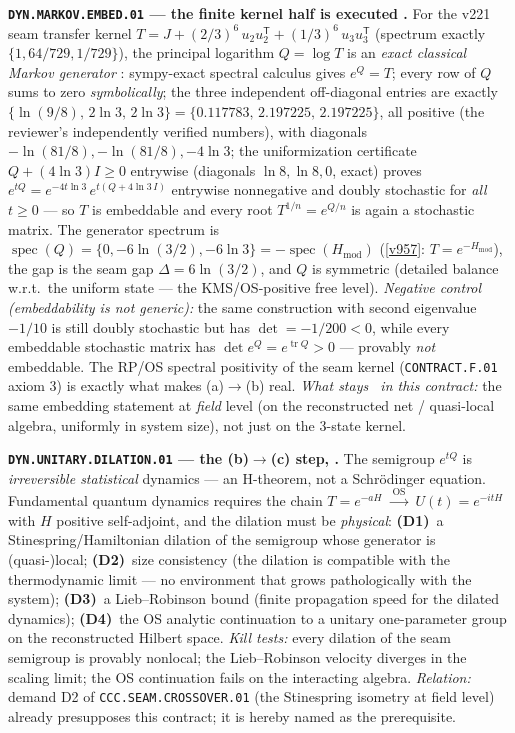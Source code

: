 \documentclass[11pt,a4paper]{article}
\begin{document}
\par\smallskip\noindent\textbf{\texttt{DYN.MARKOV.EMBED.01} --- the finite kernel half is
executed \mE.}  For the v221 seam transfer
kernel $T=J+(2/3)^6\,u_2u_2^{\mathsf T}+(1/3)^6\,u_3u_3^{\mathsf T}$ (spectrum exactly
$\{1,64/729,1/729\}$), the principal logarithm $Q=\log T$ is an \emph{exact classical Markov
generator} : sympy-exact spectral calculus gives
$e^Q=T$; every row of $Q$ sums to zero
\emph{symbolically}; the three independent off-diagonal entries are exactly
$\{\ln(9/8),\,2\ln 3,\,2\ln 3\}=\{0.117783,\,2.197225,\,2.197225\}$, all positive (the reviewer's
independently verified numbers), with diagonals $-\ln(81/8),-\ln(81/8),-4\ln3$; the
uniformization certificate $Q+(4\ln3)I\ge0$ entrywise (diagonals $\ln8,\ln8,0$, exact) proves
$e^{tQ}=e^{-4t\ln3}\,e^{t(Q+4\ln3\,I)}$ entrywise nonnegative and doubly stochastic for
\emph{all} $t\ge0$ --- so $T$ is embeddable and every root $T^{1/n}=e^{Q/n}$ is again a
stochastic matrix.  The generator spectrum is
$\operatorname{spec}(Q)=\{0,-6\ln(3/2),-6\ln3\}=-\operatorname{spec}(H_{\mathrm{mod}})$
(\vref{v957}: $T=e^{-H_{\mathrm{mod}}}$), the gap is the seam gap $\Delta=6\ln(3/2)$, and $Q$ is
symmetric (detailed balance w.r.t.\ the uniform state --- the KMS/OS-positive free level).
\emph{Negative control (embeddability is not generic):} the same construction with second
eigenvalue $-1/10$ is still doubly stochastic but has $\det=-1/200<0$, while every embeddable
stochastic matrix has $\det e^Q=e^{\operatorname{tr}Q}>0$ --- provably \emph{not} embeddable.
The RP/OS spectral positivity of the seam kernel (\texttt{CONTRACT.F.01} axiom 3) is exactly
what makes (a)$\to$(b) real.  \emph{What stays \mO\ in this contract:} the same embedding
statement at \emph{field} level (on the reconstructed net / quasi-local algebra, uniformly in
system size), not just on the 3-state kernel.

\par\smallskip\noindent\textbf{\texttt{DYN.UNITARY.DILATION.01} --- the (b)$\to$(c) step,
\mO.}  The semigroup $e^{tQ}$ is \emph{irreversible statistical} dynamics --- an H-theorem, not
a Schr\"odinger equation.  Fundamental quantum dynamics requires the chain
$T=e^{-aH}\;\xrightarrow{\ \mathrm{OS}\ }\;U(t)=e^{-itH}$ with $H$ positive self-adjoint, and
the dilation must be \emph{physical}: \textbf{(D1)}~a Stinespring/Hamiltonian dilation of the
semigroup whose generator is (quasi-)local; \textbf{(D2)}~size consistency (the dilation is
compatible with the thermodynamic limit --- no environment that grows pathologically with the
system); \textbf{(D3)}~a Lieb--Robinson bound (finite propagation speed for the dilated
dynamics); \textbf{(D4)}~the OS analytic continuation to a unitary one-parameter group on the
reconstructed Hilbert space.  \emph{Kill tests:} every dilation of the seam semigroup is
provably nonlocal; the Lieb--Robinson velocity diverges in the scaling limit; the OS
continuation fails on the interacting algebra.  \emph{Relation:} demand D2 of
\texttt{CCC.SEAM.CROSSOVER.01} (the Stinespring isometry at field level) already presupposes
this contract; it is hereby named as the prerequisite.
\end{document}
